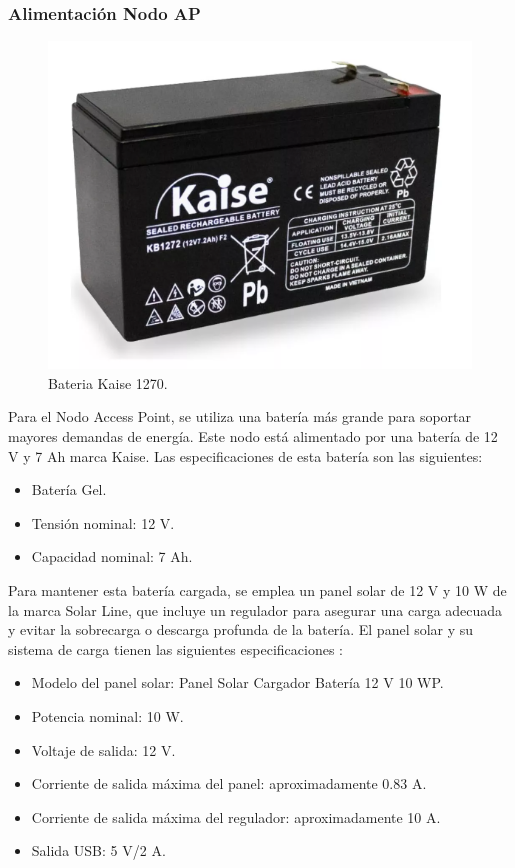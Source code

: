 \subsubsection{Alimentación Nodo AP}

\begin{figure}[H]
	\centering
	\includegraphics[scale=0.6]{./Figures/Hardware/Alimentacion/bateria.png}
	\caption{Bateria Kaise 1270.}
	\label{fig:bateria}
\end{figure}

\label{sec:AlimentacionNodoAP}

Para el Nodo Access Point, se utiliza una batería más grande para soportar mayores demandas de energía. Este nodo está alimentado por una batería de 12 V y 7 Ah marca Kaise\cite{kaise}. 
Las especificaciones de esta batería son las siguientes:

\begin{itemize}
    \item Batería Gel.
    \item Tensión nominal: 12 V.
    \item Capacidad nominal: 7 Ah.
\end{itemize}

Para mantener esta batería cargada, se emplea un panel solar de 12 V y 10 W de la marca Solar Line, que incluye un regulador  para asegurar una carga adecuada y evitar la sobrecarga o descarga profunda de la batería. El panel solar y su sistema de carga tienen las siguientes especificaciones \citep{SolarLine}:

\begin{itemize}
    \item Modelo del panel solar: Panel Solar Cargador Batería 12 V 10 WP.
    \item Potencia nominal: 10 W.
    \item Voltaje de salida: 12 V.
    \item Corriente de salida máxima del panel: aproximadamente 0.83 A.
    \item Corriente de salida máxima del regulador: aproximadamente 10 A.
    \item Salida USB: 5 V/2 A.
\end{itemize}

